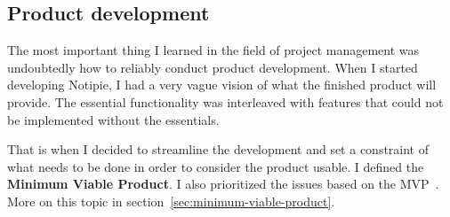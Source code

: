 \subsection{Product development}\label{sec:product-development}

The most important thing
I learned in the field of project management
was undoubtedly how to reliably conduct product development.
When I started developing Notipie,
I had a very vague vision
of what the finished product will provide.
The essential functionality was interleaved with features
that could not be implemented without the essentials.

That is when I decided to streamline the development
and set a constraint of what needs to be done
in order to consider the product usable.
I defined the \textbf{Minimum Viable Product}.
I also prioritized the issues
based on the MVP~\cite{sewera_issues_2022}.
More on this topic in section~\ref{sec:minimum-viable-product}.
